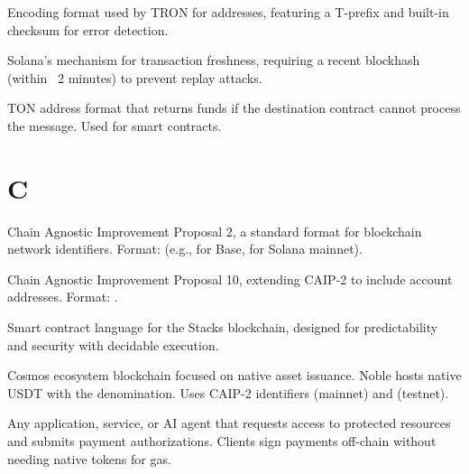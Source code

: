 \begin{description}[style=nextline]

\item[Base58Check]
Encoding format used by TRON for addresses, featuring a T-prefix and built-in checksum for error detection.

\item[Blockhash]
Solana's mechanism for transaction freshness, requiring a recent blockhash (within ~2 minutes) to prevent replay attacks.

\item[Bounceable Address]
TON address format that returns funds if the destination contract cannot process the message. Used for smart contracts.

\end{description}

\section*{C}

\begin{description}[style=nextline]

\item[CAIP-2]
Chain Agnostic Improvement Proposal 2, a standard format for blockchain network identifiers. Format:  (e.g.,  for Base,  for Solana mainnet).

\item[CAIP-10]
Chain Agnostic Improvement Proposal 10, extending CAIP-2 to include account addresses. Format: .

\item[Clarity]
Smart contract language for the Stacks blockchain, designed for predictability and security with decidable execution.

\item[Cosmos/Noble]
Cosmos ecosystem blockchain focused on native asset issuance. Noble hosts native USDT with the  denomination. Uses CAIP-2 identifiers  (mainnet) and  (testnet).

\item[Client]
Any application, service, or AI agent that requests access to protected resources and submits payment authorizations. Clients sign payments off-chain without needing native tokens for gas.

\end{description}

